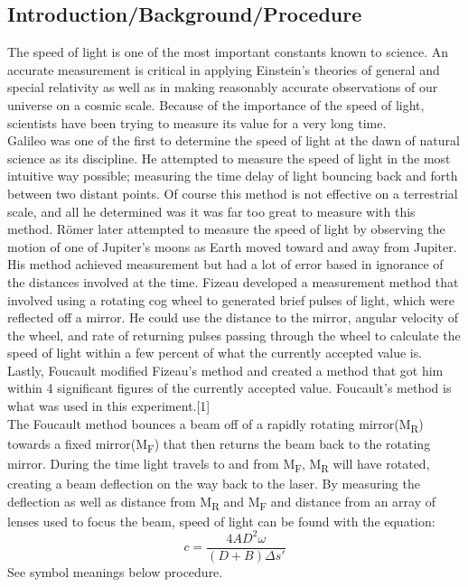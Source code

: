 \documentclass[12pt]{report}
\begin{document}
\subsection*{Introduction/Background/Procedure}
The speed of light is one of the most important constants known to science. An accurate measurement is critical in applying Einstein's theories of general and special relativity as well as in making reasonably accurate observations of our universe on a cosmic scale. Because of the importance of the speed of light, scientists have been trying to measure its value for a very long time.\\[10pt]
Galileo was one of the first to determine the speed of light at the dawn of natural science as its discipline. He attempted to measure the speed of light in the most intuitive way possible; measuring the time delay of light bouncing back and forth between two distant points. Of course this method is not effective on a terrestrial scale, and all he determined was it was far too great to measure with this method. R{\"o}mer later attempted to measure the speed of light by observing the motion of one of Jupiter's moons as Earth moved toward and away from Jupiter. His method achieved measurement but had a lot of error based in ignorance of the distances involved at the time. Fizeau developed a measurement method that involved using a rotating cog wheel to generated brief pulses of light, which were reflected off a mirror. He could use the distance to the mirror, angular velocity of the wheel, and rate of returning pulses passing through the wheel to calculate the speed of light within a few percent of what the currently accepted value is. Lastly, Foucault modified Fizeau's method and created a method that got him within 4 significant figures of the currently accepted value. Foucault's method is what was used in this experiment.[1]\\[10pt]
The Foucault method bounces a beam off of a rapidly rotating mirror(M\textsubscript{R}) towards a fixed mirror(M\textsubscript{F}) that then returns the beam back to the rotating mirror. During the time light travels to and from M\textsubscript{F}, M\textsubscript{R} will have rotated, creating a beam deflection on the way back to the laser. By measuring the deflection as well as distance from M\textsubscript{R} and M\textsubscript{F} and distance from an array of lenses used to focus the beam, speed of light can be found with the equation:
$$c=\frac{4AD^2\omega}{(D+B)\Delta s'}$$
See symbol meanings below procedure.\\[10pt]
\end{document}
